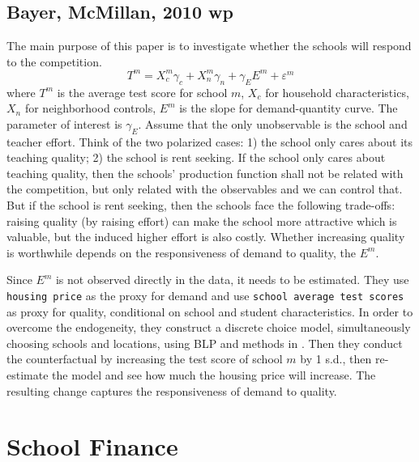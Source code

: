 

\section{Bayer, McMillan, 2010 wp} %
\label{sec:bayer_mcmillan_2010_wp}

\textbf{}

The main purpose of this paper is to investigate whether the schools will respond to the competition. 
\[
    T^{m}=X_{c}^{m} \gamma_{c}+X_{n}^{m} \gamma_{n}+\gamma_{E} E^{m}+\varepsilon^{m}
\]
where $T^m$ is the average test score for school $m$, $X_c$ for household characteristics, $X_n$ for neighborhood controls, $E^m$ is the slope for demand-quantity curve.
The parameter of interest is $\gamma_E$.
Assume that the only unobservable is the school and teacher effort.
Think of the two polarized cases:
1) the school only cares about its teaching quality;
2) the school is rent seeking.
If the school only cares about teaching quality, then the schools' production function shall not be related with the competition, but only related with the observables and we can control that. 
But if the school is rent seeking, then the schools face the following trade-offs: raising quality (by raising effort) can make the school more attractive which is valuable, but the induced higher effort is also costly.
Whether increasing quality is worthwhile depends on the responsiveness of demand to quality, the $E^m$.

Since $E^m$ is not observed directly in the data, it needs to be estimated.
They use \texttt{housing price} as the proxy for demand and use \texttt{school average test scores} as proxy for quality, conditional on school and student characteristics.
In order to overcome the endogeneity, they construct a discrete choice model, simultaneously choosing schools and locations, using BLP and methods in \textcite{BayerFerreiraMcMillan2007}.
Then they conduct the counterfactual by increasing the test score of school $m$ by 1 s.d., then re-estimate the model and see how much the housing price will increase.
The resulting change captures the responsiveness of demand to quality.




\chapter{School Finance} %
\label{cha:school_finance}

